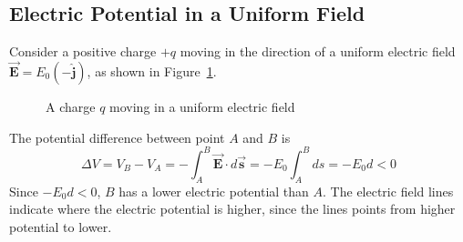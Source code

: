 \subsection{Electric Potential in a Uniform Field}
Consider a positive charge $+q$ moving in the direction of a uniform electric field $\vec{\boldsymbol{E}} = E_0(-\hat{\boldsymbol{j}})$, as shown in Figure~\ref{fig:charge-moving-in-a-uniform-electric-field}.

\begin{figure}[H]
\centering
{}
  \caption{A charge $q$ moving in a uniform electric field}
  \label{fig:charge-moving-in-a-uniform-electric-field}
\end{figure}

The potential difference between point $A$ and $B$ is
\begin{equation*}
  \Delta V = V_B - V_A = -\int_A^B \vec{\boldsymbol{E}} \cdot d\vec{\boldsymbol{s}} = -E_0\int_A^B ds = -E_0d < 0
\end{equation*}
Since $-E_0d < 0$, $B$ has a lower electric potential than $A$. The electric field lines indicate where the electric potential is higher, since the lines points from higher potential to lower.

